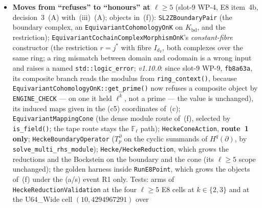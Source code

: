 \documentclass[11pt]{article}
\theoremstyle{remark}
\newcommand{\F}{\mathbb{F}}
\newcommand{\Fl}{\F_\ell}
\begin{document}
\begin{enumerate}[label=(b\arabic*)]
\begin{itemize}
    (review finding m-1, open). \emph{v1.10.0: closed} (slot-9 WP-9, \texttt{fb8a63a}):
    \texttt{SmallEllPolicyScopeValidation} (\texttt{fast}) scans the tree and allows the token
    \texttt{SmallEllPolicy::Bredon} only in \texttt{EquivariantCohomologyOnK.cpp},
    \texttt{Hecke/CoefficientRing.\{h,cpp\}}, validation files and (v1.10.1) the guard's own
    translation unit \texttt{Registry/Slot9/WP9.cpp}, and asserts that the one caller's
    site still exists. It caught the one violation the slot produced: WP-8's ring job named the
    policy at $\ell\in\{2,3\}$, a merge interaction of WP-8 and WP-9, repaired by \texttt{158c0be}
    as the lead ruled --- the job loop builds its relation list from the raw
    \texttt{ModCtx::prime\_power} context (the same value), and the Bredon lift stays with
    \texttt{EquivariantCohomologyOnK} alone, whose constructor re-derives the context under the
    policy. The allow-list did not change.
  \item \textbf{Moves from ``refuses'' to ``honours'' at $\ell\ge5$} (slot-9 WP-4, E8 item~4b,
    decision~3~(A) with~(iii)~(A); objects in~(f)): \texttt{SL2ZBoundaryPair} (the boundary
    complex, an \texttt{EquivariantCohomologyOnK} on $K_{\mathrm{bd}}$, and the restriction);
    \texttt{EquivariantCochainComplexMorphismOnK}'s \emph{constant-fibre} constructor (the
    restriction $r=j^{\ast}$ with fibre $I_{d_V}$, both complexes over the same ring; a ring
    mismatch between domain and codomain is a wrong input and raises a named
    \texttt{std::logic\_error}; \emph{v1.10.0}: since slot-9 WP-9, \texttt{fb8a63a}, its composite
    branch reads the modulus from \texttt{ring\_context()}, because
    \texttt{EquivariantCohomologyOnK::get\_prime()} now refuses a composite object by
    \texttt{ENGINE\_CHECK} --- on one it held $\ell^k$, not a prime --- the value is unchanged),
    its induced maps given in the (c5) coordinates of~(c);
    \texttt{EquivariantMappingCone} (the dense module route of~(f), selected by
    \texttt{is\_field()}; the tape route stays the $\Fl$ path); \texttt{HeckeConeAction},
    \textbf{route~1 only}; \texttt{HeckeBoundaryOperator} ($T_p^{\partial}$ on the cyclic summands
    of $H^q(\partial)$, by \texttt{solve\_multi\_rhs\_module}); \texttt{Hecke/HeckeReduction}, which
    grows the reductions and the Bockstein on the boundary and the cone (its $\ell\ge5$ scope
    unchanged); the golden harness inside \texttt{RunE8Point}, which grows the objects of~(f)
    under the (a/s) event R1 only. Tests: arms of \texttt{HeckeReductionValidation} at the four
    $\ell\ge5$ E8 cells at $k\in\{2,3\}$ and at the U64\_Wide cell $(10,4294967291)$ over

\end{itemize}
\end{enumerate}
\end{document}
